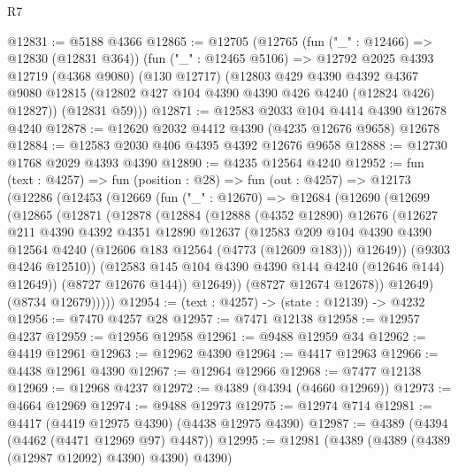 \begin{lexlean}{R7}
\begin{coremodule}
@12831 := @5188 @4366
@12865 := @12705
    (@12765
      (fun ("_" : @12466) => @12830 (@12831 @364))
      (fun ("_" : @12465 @5106) =>
      @12792
        @2025
        @4393
        @12719
        (@4368 @9080)
        (@130 @12717)
        (@12803
          @429
          @4390
          @4392
          @4367
          @9080
          @12815
          (@12802 @427 @104 @4390 @4390 @426 @4240 (@12824 @426) @12827))
        (@12831 @59)))
@12871 := @12583 @2033 @104 @4414 @4390 @12678 @4240
@12878 := @12620 @2032 @4412 @4390 (@4235 @12676 @9658) @12678
@12884 := @12583 @2030 @406 @4395 @4392 @12676 @9658
@12888 := @12730 @1768 @2029 @4393 @4390
@12890 := @4235 @12564 @4240
@12952 := fun (text : @4257) =>
  fun (position : @28) =>
  fun (out : @4257) =>
  @12173
    (@12286
      (@12453
        (@12669
          (fun ("_" : @12670) =>
          @12684
            (@12690
              (@12699
                (@12865
                  (@12871
                    (@12878
                      (@12884
                        (@12888
                          (@4352 @12890)
                          @12676
                          (@12627
                            @211
                            @4390
                            @4392
                            @4351
                            @12890
                            @12637
                            (@12583
                              @209
                              @104
                              @4390
                              @4390
                              @12564
                              @4240
                              (@12606 @183 @12564 (@4773 (@12609 @183)))
                              @12649))
                          (@9303 @4246 @12510))
                        (@12583 @145 @104 @4390 @4390 @144 @4240 (@12646 @144) @12649))
                      (@8727 @12676 @144))
                    @12649))
                (@8727 @12674 @12678))
              @12649)
            (@8734 @12679)))))
@12954 := (text : @4257) -> (state : @12139) -> @4232
@12956 := @7470 @4257 @28
@12957 := @7471 @12138
@12958 := @12957 @4237
@12959 := @12956 @12958
@12961 := @9488 @12959 @34
@12962 := @4419 @12961
@12963 := @12962 @4390
@12964 := @4417 @12963
@12966 := @4438 @12961 @4390
@12967 := @12964 @12966
@12968 := @7477 @12138
@12969 := @12968 @4237
@12972 := @4389 (@4394 (@4660 @12969))
@12973 := @4664 @12969
@12974 := @9488 @12973
@12975 := @12974 @714
@12981 := @4417 (@4419 @12975 @4390) (@4438 @12975 @4390)
@12987 := @4389 (@4394 (@4462 (@4471 @12969 @97) @4487))
@12995 := @12981 (@4389 (@4389 (@4389 (@12987 @12092) @4390) @4390) @4390)

\end{coremodule}
\end{lexlean}
